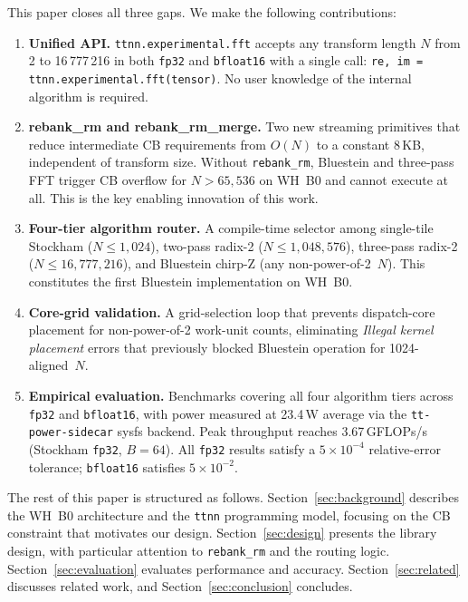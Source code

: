 \documentclass[conference]{IEEEtran}
\begin{document}
This paper closes all three gaps. We make the following contributions:

\begin{enumerate}

\item \textbf{Unified API.} \texttt{ttnn.experimental.fft} accepts any transform
  length $N$ from 2 to 16\,777\,216 in both \texttt{fp32} and \texttt{bfloat16}
  with a single call: \texttt{re, im = ttnn.experimental.fft(tensor)}. No user
  knowledge of the internal algorithm is required.

\item \textbf{rebank\_rm and rebank\_rm\_merge.} Two new streaming primitives
  that reduce intermediate CB requirements from $O(N)$ to a constant 8\,KB,
  independent of transform size. Without \texttt{rebank\_rm}, Bluestein and
  three-pass FFT trigger CB overflow for $N > 65{,}536$ on WH~B0 and cannot
  execute at all. This is the key enabling innovation of this work.

\item \textbf{Four-tier algorithm router.} A compile-time selector among
  single-tile Stockham ($N \leq 1{,}024$), two-pass radix-2
  ($N \leq 1{,}048{,}576$), three-pass radix-2 ($N \leq 16{,}777{,}216$), and
  Bluestein chirp-Z (any non-power-of-2~$N$). This constitutes the first
  Bluestein implementation on WH~B0.

\item \textbf{Core-grid validation.} A grid-selection loop that prevents
  dispatch-core placement for non-power-of-2 work-unit counts, eliminating
  \textit{Illegal kernel placement} errors that previously blocked Bluestein
  operation for 1024-aligned~$N$.

\item \textbf{Empirical evaluation.} Benchmarks covering all four algorithm
  tiers across \texttt{fp32} and \texttt{bfloat16}, with power measured at
  23.4\,W average via the \texttt{tt-power-sidecar} sysfs backend. Peak
  throughput reaches 3.67\,GFLOPs/s (Stockham \texttt{fp32}, $B{=}64$). All
  \texttt{fp32} results satisfy a $5{\times}10^{-4}$ relative-error tolerance;
  \texttt{bfloat16} satisfies $5{\times}10^{-2}$.

\end{enumerate}

The rest of this paper is structured as follows. Section~\ref{sec:background}
describes the WH~B0 architecture and the \texttt{ttnn} programming model,
focusing on the CB constraint that motivates our design.
Section~\ref{sec:design} presents the library design, with particular attention
to \texttt{rebank\_rm} and the routing logic. Section~\ref{sec:evaluation}
evaluates performance and accuracy. Section~\ref{sec:related} discusses related
work, and Section~\ref{sec:conclusion} concludes.
\end{document}

